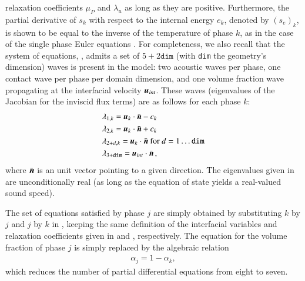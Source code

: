 \documentclass[preprint,10pt]{elsarticle}
\begin{document}
relaxation coefficients $\mu_P$ and $\lambda_u$ as long as they are positive. Furthermore, 
the partial derivative of $s_k$ with respect to the internal energy $e_k$, denoted by $(s_e)_k$, is shown to be equal to the inverse of the temperature 
of phase $k$, as in the case of the single phase Euler equations \cite{jlg, Marco_dissertation}. For completeness, we also recall that the system of equations, 
, 
admits a set of $5+2\texttt{dim}$ (with \texttt{dim} the geometry's dimension) waves 
is present in the model: two acoustic waves per phase, one contact wave per phase per domain dimension, and one volume fraction wave propagating 
at the interfacial velocity $\boldsymbol u_{int}$. These waves (eigenvalues of the Jacobian for the inviscid flux terms) are as follows for each phase $k$:
% 
\begin{align}\label{eq:eigenvalues}
&\lambda_{1,k} = \boldsymbol u_k \cdot \bar{\boldsymbol n} - c_k \nonumber\\
&\lambda_{2,k} = \boldsymbol u_k \cdot \bar{\boldsymbol n} + c_k \nonumber\\
&\lambda_{2+d,k} = \boldsymbol u_k \cdot \bar{\boldsymbol n} \text{ for } d = 1 \dots \texttt{dim} \\
&\lambda_{3+\texttt{dim}} = \boldsymbol u_{int} \cdot \bar{\boldsymbol n} \nonumber \,,
\end{align}
%
where $\bar{\boldsymbol n}$ is an unit vector pointing to a given direction. The eigenvalues given in  are unconditionally 
real (as long as the equation of state yields a real-valued sound speed).

The set of equations satisfied by phase $j$ are simply obtained by substituting $k$ by $j$ and $j$ by $k$ in , keeping 
the same definition of the interfacial variables and relaxation coefficients given in  and , respectively. The 
equation for the volume fraction of phase $j$ 
is simply replaced by the algebraic relation
%
\begin{align}
 \alpha_{j}= 1 - \alpha_{k}, \nonumber
\end{align}
%
which reduces the number of partial differential equations from eight to seven. %
%
\end{document}
